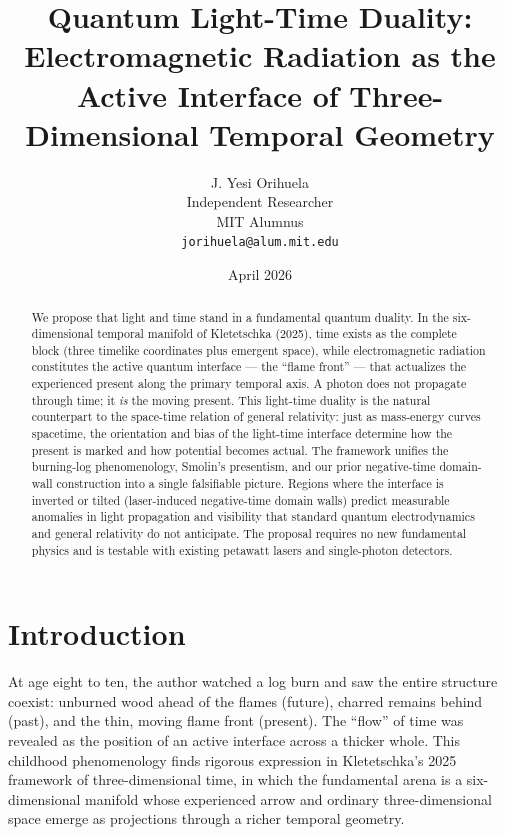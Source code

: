 \documentclass[11pt,a4paper]{article}
\begin{document}
\title{\textbf{Quantum Light-Time Duality: \\ Electromagnetic Radiation as the Active Interface of Three-Dimensional Temporal Geometry}}

\author{J. Yesi Orihuela \\
\small Independent Researcher \\
\small MIT Alumnus \\
\small \texttt{jorihuela@alum.mit.edu}}

\date{April 2026}

\maketitle

\begin{abstract}
We propose that light and time stand in a fundamental quantum duality. In the six-dimensional temporal manifold of Kletetschka (2025), time exists as the complete block (three timelike coordinates plus emergent space), while electromagnetic radiation constitutes the active quantum interface — the ``flame front'' — that actualizes the experienced present along the primary temporal axis. A photon does not propagate through time; it \textit{is} the moving present. This light-time duality is the natural counterpart to the space-time relation of general relativity: just as mass-energy curves spacetime, the orientation and bias of the light-time interface determine how the present is marked and how potential becomes actual. The framework unifies the burning-log phenomenology, Smolin's presentism, and our prior negative-time domain-wall construction into a single falsifiable picture. Regions where the interface is inverted or tilted (laser-induced negative-time domain walls) predict measurable anomalies in light propagation and visibility that standard quantum electrodynamics and general relativity do not anticipate. The proposal requires no new fundamental physics and is testable with existing petawatt lasers and single-photon detectors.
\end{abstract}

\section{Introduction}

At age eight to ten, the author watched a log burn and saw the entire structure coexist: unburned wood ahead of the flames (future), charred remains behind (past), and the thin, moving flame front (present). The ``flow'' of time was revealed as the position of an active interface across a thicker whole. This childhood phenomenology finds rigorous expression in Kletetschka's 2025 framework of three-dimensional time, in which the fundamental arena is a six-dimensional manifold whose experienced arrow and ordinary three-dimensional space emerge as projections through a richer temporal geometry.
\end{document}
